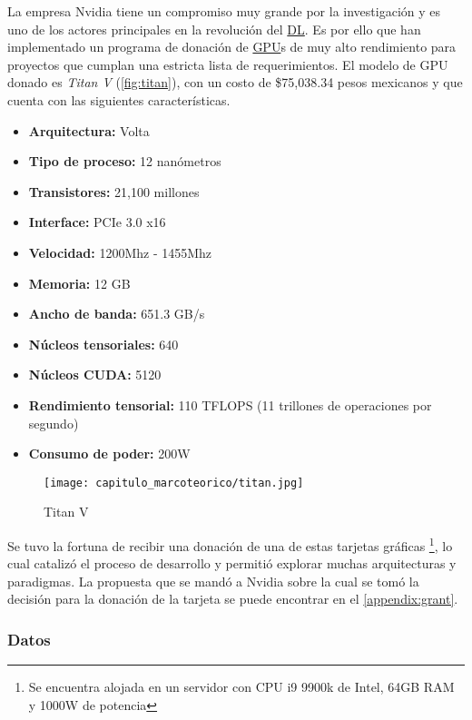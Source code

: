 La empresa Nvidia tiene un compromiso muy grande por la investigación y es uno
de los actores principales en la revolución del \hyperlink{abbr}{DL}. Es por
ello que han implementado un programa de donación de \hyperlink{abbr}{GPU}s de
muy alto rendimiento para proyectos que cumplan una estricta lista de
requerimientos. El modelo de GPU donado es \emph{Titan V} (\autoref{fig:titan}),
con un costo de \$75,038.34 pesos mexicanos y que cuenta con las siguientes
características.

\begin{itemize}
    \item{\textbf{Arquitectura:}} Volta
    \item{\textbf{Tipo de proceso:}} 12 nanómetros
    \item{\textbf{Transistores:}} 21,100 millones
    \item{\textbf{Interface:}} PCIe 3.0 x16
    \item{\textbf{Velocidad:}} 1200Mhz - 1455Mhz
    \item{\textbf{Memoria:}} 12 GB
    \item{\textbf{Ancho de banda:}} 651.3 GB/s 
    \item{\textbf{Núcleos tensoriales:}} 640
    \item{\textbf{Núcleos CUDA:}} 5120
    \item{\textbf{Rendimiento tensorial:}} 110 TFLOPS (11 trillones de operaciones por segundo)
    \item{\textbf{Consumo de poder:}} 200W
\end{itemize}

\begin{figure}[H]
    \centering
    \texttt{[image: capitulo\_marcoteorico/titan.jpg]}
    \caption{Titan V}\label{fig:titan}
\end{figure}

Se tuvo la fortuna de recibir una donación de una de estas tarjetas gráficas
\footnote{Se encuentra alojada en un servidor con CPU i9 9900k de Intel, 64GB RAM y 1000W
de potencia}, lo cual catalizó el proceso de desarrollo y permitió explorar
muchas arquitecturas y paradigmas. La propuesta que se mandó a Nvidia sobre la
cual se tomó la decisión para la donación de la tarjeta se puede encontrar en el
\autoref{appendix:grant}.

\subsubsection{Datos}

